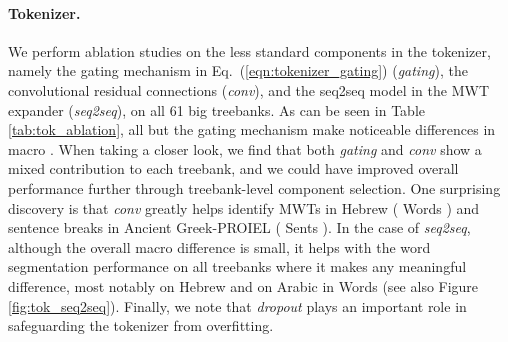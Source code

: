 \documentclass[11pt,a4paper]{article}
\newcommand{\fone}{}
\begin{document}
\paragraph{Tokenizer.}
We perform ablation studies on the less standard components in the tokenizer, namely the gating mechanism in Eq.~(\ref{eqn:tokenizer_gating}) (\textit{gating}), the convolutional residual connections (\textit{conv}), and the seq2seq model in the MWT expander (\textit{seq2seq}), on all 61 big treebanks. As can be seen in Table \ref{tab:tok_ablation}, all but the gating mechanism make noticeable differences in macro \fone{}. When taking a closer look, we find that both \textit{gating} and \textit{conv} show a mixed contribution to each treebank, and we could have improved overall performance further through treebank-level component selection.
One surprising discovery is that \textit{conv} greatly helps identify MWTs in Hebrew ( Words \fone{}) and sentence breaks in Ancient Greek-PROIEL ( Sents \fone{}).
In the case of \textit{seq2seq}, although the overall macro difference is small, it helps with the word segmentation performance on all treebanks where it makes any meaningful difference, most notably  on Hebrew and  on Arabic in Words \fone{} (see also Figure \ref{fig:tok_seq2seq}).
Finally, we note that \emph{dropout} plays an important role in safeguarding the tokenizer from overfitting.
\end{document}

